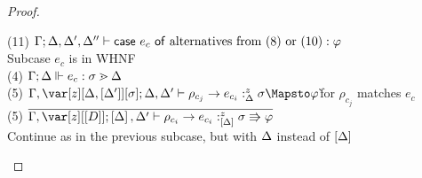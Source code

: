 \begin{proof}
\begin{tabbing}
    (11) $\Gamma;\Delta,\Delta',\Delta'' \vdash \mathsf{case}~e_c~\mathsf{of}~\textrm{alternatives from}~(8)~\textrm{or}~(10) : \varphi$\\
    Subcase $e_c$ is in WHNF\\
    (4) $\Gamma; \Delta \Vdash e_c : \sigma \gtrdot \Delta$\\
    (5) $\G, \zD; \D,\D' \vdash \rho_{c_j} \to e_{c_i} :^z_\D \s \Mapsto \vp$\`for $\rho_{c_j}$ matches $e_c$\\
    (5) $\ov{\G, \z[\irr{D}]; \irr{\D},\D' \vdash \rho_{c_i} \to e_{c_i} :^z_{\irr{\D}} \s \Rrightarrow \vp}$\\
    Continue as in the previous subcase, but with $\Delta$ instead of $\left[\Delta\right]$\\

\end{tabbing}
\end{proof}
